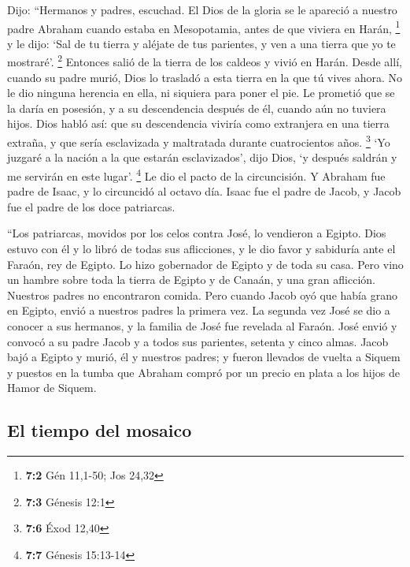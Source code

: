 \begin{paracol}{2}
 Dijo: ``Hermanos y padres, escuchad. El Dios de la gloria
se le apareció a nuestro padre Abraham cuando estaba en Mesopotamia,
antes de que viviera en Harán, \footnote{\textbf{7:2} Gén 11,1-50; Jos
  24,32}  y le dijo: `Sal de tu tierra y aléjate de tus
parientes, y ven a una tierra que yo te mostraré'. \footnote{\textbf{7:3}
  Génesis 12:1}  Entonces salió de la tierra de los
caldeos y vivió en Harán. Desde allí, cuando su padre murió, Dios lo
trasladó a esta tierra en la que tú vives ahora.  No le
dio ninguna herencia en ella, ni siquiera para poner el pie. Le prometió
que se la daría en posesión, y a su descendencia después de él, cuando
aún no tuviera hijos.  Dios habló así: que su descendencia
viviría como extranjera en una tierra extraña, y que sería esclavizada y
maltratada durante cuatrocientos años. \footnote{\textbf{7:6} Éxod 12,40}
 `Yo juzgaré a la nación a la que estarán esclavizados',
dijo Dios, `y después saldrán y me servirán en este lugar'. \footnote{\textbf{7:7}
  Génesis 15:13-14}  Le dio el pacto de la circuncisión. Y
Abraham fue padre de Isaac, y lo circuncidó al octavo día. Isaac fue el
padre de Jacob, y Jacob fue el padre de los doce patriarcas.

 ``Los patriarcas, movidos por los celos contra José, lo
vendieron a Egipto. Dios estuvo con él  y lo libró de
todas sus aflicciones, y le dio favor y sabiduría ante el Faraón, rey de
Egipto. Lo hizo gobernador de Egipto y de toda su casa. 
Pero vino un hambre sobre toda la tierra de Egipto y de Canaán, y una
gran aflicción. Nuestros padres no encontraron comida. 
Pero cuando Jacob oyó que había grano en Egipto, envió a nuestros padres
la primera vez.  La segunda vez José se dio a conocer a
sus hermanos, y la familia de José fue revelada al Faraón.
 José envió y convocó a su padre Jacob y a todos sus
parientes, setenta y cinco almas.  Jacob bajó a Egipto y
murió, él y nuestros padres;  y fueron llevados de vuelta
a Siquem y puestos en la tumba que Abraham compró por un precio en plata
a los hijos de Hamor de Siquem.

\hypertarget{el-tiempo-del-mosaico}{%
\subsection{El tiempo del mosaico}\label{el-tiempo-del-mosaico}}


\end{paracol}
